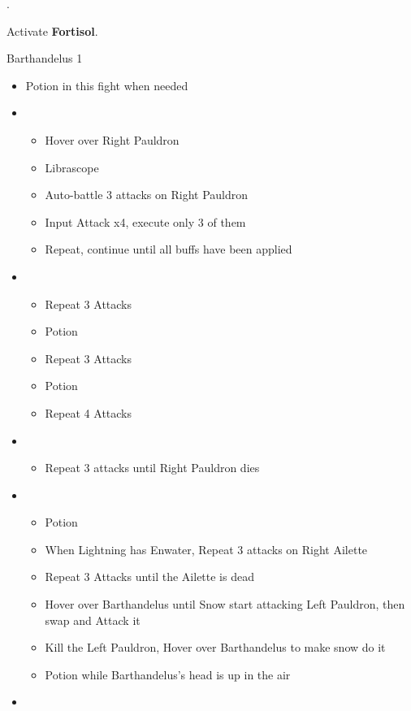 \documentclass{report}
\begin{document}
.

Activate \textbf{Fortisol}.

\begin{battle}{Barthandelus 1}
\begin{itemize}
    \item Potion in this fight when needed
    \item \first
    \begin{itemize}
        \item Hover over Right Pauldron
        \item Librascope
        \item Auto-battle 3 attacks on Right Pauldron
        \item Input Attack x4, execute only 3 of them
        \item Repeat, continue until all buffs have been applied
    \end{itemize}
    \item \sixth
    \begin{itemize}
        \item Repeat 3 Attacks
        \item Potion
        \item Repeat 3 Attacks
        \item Potion
        \item Repeat 4 Attacks
    \end{itemize}
    \item \fifth
    \begin{itemize}
        \item Repeat 3 attacks until Right Pauldron dies
    \end{itemize}
    \item \first
    \begin{itemize}
        \item Potion
        \item When Lightning has Enwater, Repeat 3 attacks on Right Ailette
        \item Repeat 3 Attacks until the Ailette is dead
        \item Hover over Barthandelus until Snow start attacking Left Pauldron, then swap and Attack it
        \item Kill the Left Pauldron, Hover over Barthandelus to make snow do it
        \item Potion while Barthandelus's head is up in the air
    \end{itemize}
    \item \second

\end{itemize}
\end{battle}
\end{document}
